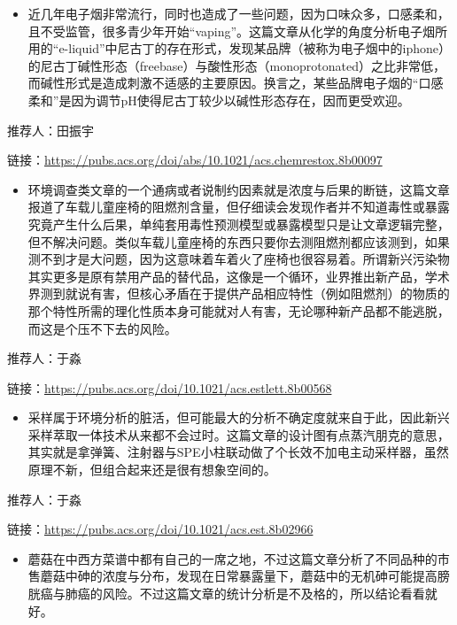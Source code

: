 \documentclass[]{book}
\providecommand{\tightlist}{%
  \setlength{\itemsep}{0pt}\setlength{\parskip}{0pt}}
\begin{document}
\begin{itemize}
\tightlist
\item
  近几年电子烟非常流行，同时也造成了一些问题，因为口味众多，口感柔和，且不受监管，很多青少年开始``vaping''。这篇文章从化学的角度分析电子烟所用的``e-liquid''中尼古丁的存在形式，发现某品牌（被称为电子烟中的iphone）的尼古丁碱性形态（freebase）与酸性形态（monoprotonated）之比非常低，而碱性形式是造成刺激不适感的主要原因。换言之，某些品牌电子烟的``口感柔和''是因为调节pH使得尼古丁较少以碱性形态存在，因而更受欢迎。
\end{itemize}

推荐人：田振宇

链接：\url{https://pubs.acs.org/doi/abs/10.1021/acs.chemrestox.8b00097}

\begin{itemize}
\tightlist
\item
  环境调查类文章的一个通病或者说制约因素就是浓度与后果的断链，这篇文章报道了车载儿童座椅的阻燃剂含量，但仔细读会发现作者并不知道毒性或暴露究竟产生什么后果，单纯套用毒性预测模型或暴露模型只是让文章逻辑完整，但不解决问题。类似车载儿童座椅的东西只要你去测阻燃剂都应该测到，如果测不到才是大问题，因为这意味着车着火了座椅也很容易着。所谓新兴污染物其实更多是原有禁用产品的替代品，这像是一个循环，业界推出新产品，学术界测到就说有害，但核心矛盾在于提供产品相应特性（例如阻燃剂）的物质的那个特性所需的理化性质本身可能就对人有害，无论哪种新产品都不能逃脱，而这是个压不下去的风险。
\end{itemize}

推荐人：于淼

链接：\url{https://pubs.acs.org/doi/10.1021/acs.estlett.8b00568}

\begin{itemize}
\tightlist
\item
  采样属于环境分析的脏活，但可能最大的分析不确定度就来自于此，因此新兴采样萃取一体技术从来都不会过时。这篇文章的设计图有点蒸汽朋克的意思，其实就是拿弹簧、注射器与SPE小柱联动做了个长效不加电主动采样器，虽然原理不新，但组合起来还是很有想象空间的。
\end{itemize}

推荐人：于淼

链接：\url{https://pubs.acs.org/doi/10.1021/acs.est.8b02966}

\begin{itemize}
\tightlist
\item
  蘑菇在中西方菜谱中都有自己的一席之地，不过这篇文章分析了不同品种的市售蘑菇中砷的浓度与分布，发现在日常暴露量下，蘑菇中的无机砷可能提高膀胱癌与肺癌的风险。不过这篇文章的统计分析是不及格的，所以结论看看就好。
\end{itemize}
\end{document}
